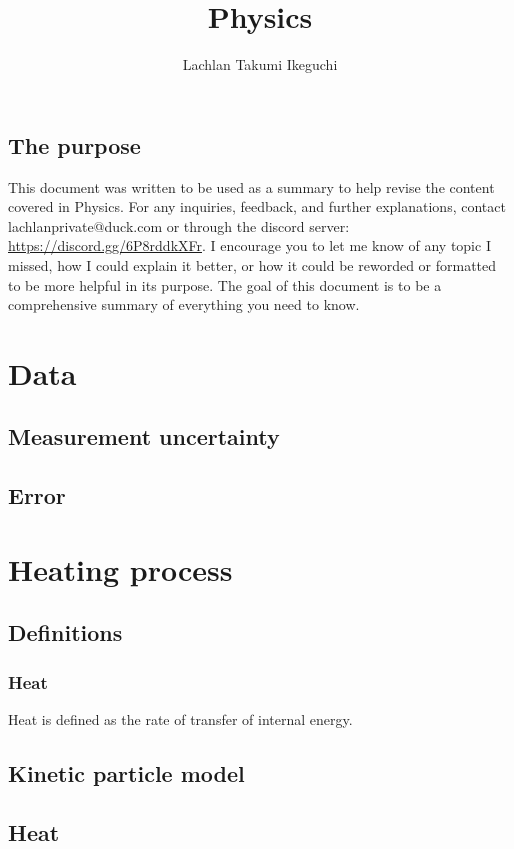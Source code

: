\documentclass{book}
\title{Physics}
\author{Lachlan Takumi Ikeguchi}
\begin{document}
\maketitle
\tableofcontents

\section{The purpose}
This document was written to be used as a summary to help revise the content covered in Physics.  For any inquiries, feedback, and further explanations, contact lachlanprivate@duck.com or through the discord server: \url{https://discord.gg/6P8rddkXFr}.  I encourage you to let me know of any topic I missed, how I could explain it better, or how it could be reworded or formatted to be more helpful in its purpose.  The goal of this document is to be a comprehensive summary of everything you need to know.



\chapter{Data}
\section{Measurement uncertainty}

\section{Error}

\chapter{Heating process}
\section{Definitions}
\subsection{Heat}
Heat is defined as the rate of transfer of internal energy.

\section{Kinetic particle model}

\section{Heat}
\end{document}
